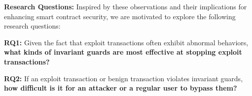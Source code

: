 




\noindent \textbf{Research Questions:} Inspired by these observations and their
implications for enhancing smart contract security, we are motivated to explore
the following research questions:

\textbf{RQ1: } Given the fact that exploit transactions often exhibit abnormal
behaviors, \textbf{what kinds of invariant guards are most effective at
stopping exploit transactions?}

\textbf{RQ2: } If an exploit transaction or benign transaction violates
invariant guards, \textbf{how difficult is it for an attacker or a regular user
to bypass them?}

